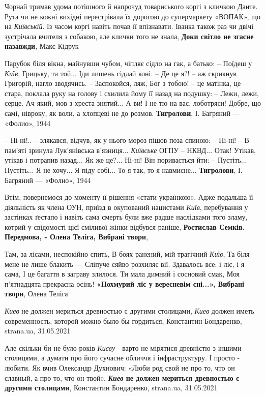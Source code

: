 Чорнай тримав удома потішного й напрочуд товариського коргі з кличкою Данте.
Рута чи не кожні вихідні перестрівала їх дорогою до супермаркету «ВОПАК», що на
\emph{Київській}. Із часом коргі навіть почав її впізнавати. Іванка також раз
чи двічі зустрічала вчителя з собакою, але клички того не знала, \textbf{Доки
світло не згасне назавжди}, Макс Кідрук

Парубок біля вікна, майнувши чубом, чіпляє сідло на гак, а батько:
– Поїдеш у \emph{Київ}, Грицьку, та той... Іди лишень сідлай коні.
– Де це я?! – аж скрикнув Григорій, нагло зводячись.
– Заспокойся, ляж, Бог з тобою! – це матінка, це стара, поклала руку на голову і схилила
йому її назад на подушку: – Лежи, лежи, серце. Ач який, мов з хреста знятий... А ви! І не тю на вас, лоботряси! Добре, що самі, нівроку, як воли, а хлопцеві не до розмов.
\textbf{Тигролови}, І. Багряний — «Фолио», 1944

– Ні-ні!.. – злякався, відчув, як у нього мороз пішов поза спиною: – Ні-ні! – В
пам'яті зринула Лук'янівська в'язниця... \emph{Київське} ОГПУ – НКВД... Отак!
Утікав, утікав і потрапив назад... Як же це?... Ні-ні! Він поривається йти: –
Пустіть... Пустіть... Я не хочу... Я піду собі... То я так, то я навмисне...
\textbf{Тигролови}, І. Багряний — «Фолио», 1944

Втім, повернемося до моменту її рішення «стати українкою». Адже подальша її
діяльність як члена ОУН, приїзд в окупований нацистами \emph{Київ}, перебування
у застінках ґестапо і навіть сама смерть були вже радше наслідками того зламу,
котрий у свідомості цієї сміливої жінки відбувся раніше, \textbf{Ростислав
Семків. Передмова, - Олена Теліга, Вибрані твори},

Там, за лісами, неспокійно спить,
В боях ранений, мій трагічний \emph{Київ},
Та біля мене не лише блакить —
Сліпуче сяйво розхиляє вії.
Здавалось все: і ліс, і я сама,
І це багаття в заграву злилося.
Ти мала димний і сосновий смак,
Моя п'ятнадцята прекрасна осінь!
\textbf{«Похмурий ліс у вересневім сні...», Вибрані твори}, Олена Теліга


\emph{Киев} не должен мериться древностью с другими столицами, \emph{Киев}
должен иметь современность, которой можно было бы гордиться, Константин
Бондаренко, strana.ua, 31.05.2021

Але скільки би не було років \emph{Києву} - варто не мірятися древністю з
іншими столицями, а думати про його сучасне обличчя і інфраструктуру. І просто
- любити. Як вчив Олександр Духнович: «Люби род свой не про то, что он славный,
а про то, что он твой», \textbf{\emph{Киев} не должен мериться древностью с
другими столицами}, Константин Бондаренко, strana.ua, 31.05.2021

